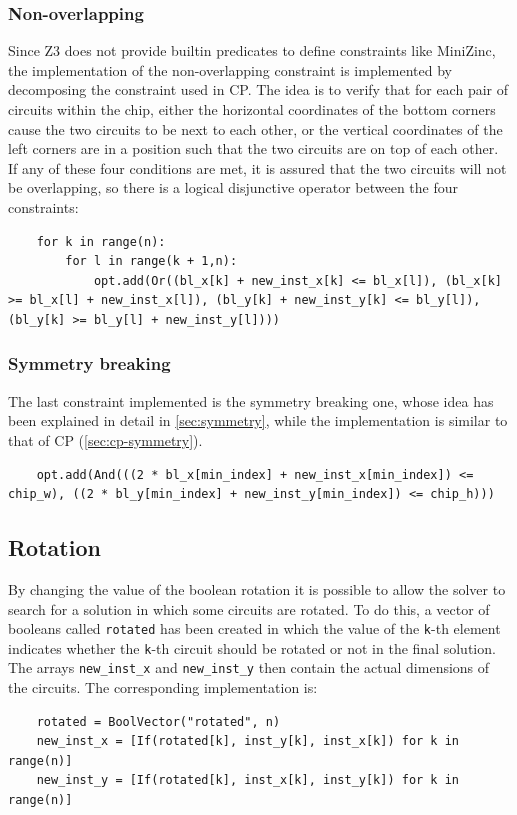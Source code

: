 \documentclass[a4paper, 12pt]{article}
\begin{document}
\subsubsection{Non-overlapping}

Since Z3 does not provide builtin predicates to define constraints like MiniZinc, the implementation of the non-overlapping constraint is implemented by decomposing the constraint used in CP. The idea is to verify that for each pair of circuits within the chip, either the horizontal coordinates of the bottom corners cause the two circuits to be next to each other, or the vertical coordinates of the left corners are in a position such that the two circuits are on top of each other. If any of these four conditions are met, it is assured that the two circuits will not be overlapping, so there is a logical disjunctive operator between the four constraints:
\begin{verbatim}
    for k in range(n):
        for l in range(k + 1,n):
            opt.add(Or((bl_x[k] + new_inst_x[k] <= bl_x[l]), (bl_x[k] >= bl_x[l] + new_inst_x[l]), (bl_y[k] + new_inst_y[k] <= bl_y[l]), (bl_y[k] >= bl_y[l] + new_inst_y[l])))
\end{verbatim}


\subsubsection{Symmetry breaking}

The last constraint implemented is the symmetry breaking one, whose idea has been explained in detail in \cref{sec:symmetry}, while the implementation is similar to that of CP (\cref{sec:cp-symmetry}).
\begin{verbatim}
    opt.add(And(((2 * bl_x[min_index] + new_inst_x[min_index]) <= chip_w), ((2 * bl_y[min_index] + new_inst_y[min_index]) <= chip_h)))
\end{verbatim}


\subsection{Rotation}

By changing the value of the boolean rotation it is possible to allow the solver to search for a solution in which some circuits are rotated. To do this, a vector of booleans called \verb|rotated| has been created in which the value of the \verb|k|-th element indicates whether the \verb|k|-th circuit should be rotated or not in the final solution. The arrays \verb|new_inst_x| and \verb|new_inst_y| then contain the actual dimensions of the circuits. The corresponding implementation is:
\begin{verbatim}
    rotated = BoolVector("rotated", n)
    new_inst_x = [If(rotated[k], inst_y[k], inst_x[k]) for k in range(n)]
    new_inst_y = [If(rotated[k], inst_x[k], inst_y[k]) for k in range(n)]
\end{verbatim}
\end{document}
